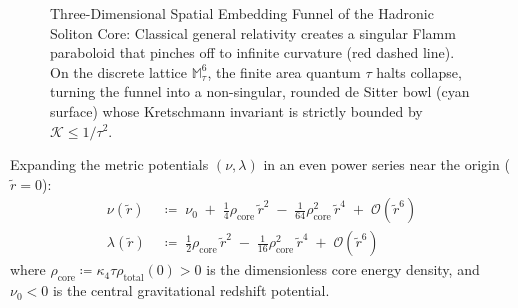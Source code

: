 \documentclass[
    12pt,
    a4paper,
    headings=normal,
    twoside=false,
    open=any,
    parskip=half
]{scrbook}
\begin{document}
\begin{figure}[htbp]
\caption{Three-Dimensional Spatial Embedding Funnel of the Hadronic Soliton Core: Classical general relativity creates a singular Flamm paraboloid that pinches off to infinite curvature (red dashed line). On the discrete lattice $\mathbb{M}_\tau^6$, the finite area quantum $\tau$ halts collapse, turning the funnel into a non-singular, rounded de Sitter bowl (cyan surface) whose Kretschmann invariant is strictly bounded by $\mathcal{K} \le 1/\tau^2$.}
\label{fig:ch3_curvature_saturation_plot}
\end{figure}

\begin{physlemma}\label{lem:ch3_frobenius_expansion}
Expanding the metric potentials $(\nu, \lambda)$ in an even power series near the origin ($\tilde{r} = 0$):
\begin{align}
\nu(\tilde{r}) &\;\coloneqq\; \nu_0 \;+\; \frac{1}{4} \rho_{\text{core}} \, \tilde{r}^2 \;-\; \frac{1}{64} \rho_{\text{core}}^2 \, \tilde{r}^4 \;+\; \mathcal{O}\left(\tilde{r}^6\right) \label{eq:ch3_nu_frobenius} \\
\lambda(\tilde{r}) &\;\coloneqq\; \frac{1}{2} \rho_{\text{core}} \, \tilde{r}^2 \;-\; \frac{1}{16} \rho_{\text{core}}^2 \, \tilde{r}^4 \;+\; \mathcal{O}\left(\tilde{r}^6\right) \label{eq:ch3_lambda_frobenius}
\end{align}
where $\rho_{\text{core}} \coloneqq \kappa_4 \tau \rho_{\text{total}}(0) > 0$ is the dimensionless core energy density, and $\nu_0 < 0$ is the central gravitational redshift potential.
\end{physlemma}
\end{document}
